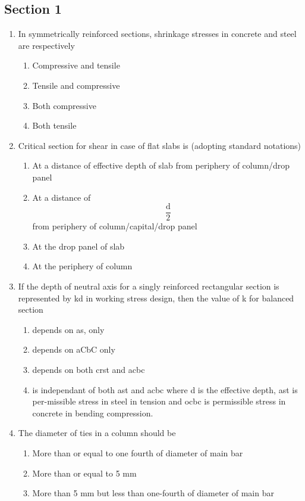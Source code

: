 \documentclass[11pt,a4paper]{article}
\begin{document}
\subsection*{Section 1}
\begin{enumerate}
\item{In symmetrically reinforced sections, shrinkage stresses in concrete and steel are respectively}
\begin{enumerate}[label=\Alph*.]
\item{Compressive and tensile}
\item{Tensile and compressive}
\item{Both compressive}
\item{Both tensile}
\end{enumerate}
\item{Critical section for shear in case of flat slabs is (adopting standard notations)}
\begin{enumerate}[label=\Alph*.]
\item{At a distance of effective depth of slab from periphery of column/drop panel}
\item{At a distance of $$\frac{{\text{d}}}{2}$$ from periphery of column/capital/drop panel}
\item{At the drop panel of slab}
\item{At the periphery of column}
\end{enumerate}
\item{If the depth of neutral axis for a singly reinforced rectangular section is represented by kd in working stress design, then the value of k for balanced section}
\begin{enumerate}[label=\Alph*.]
\item{depends on as, only}
\item{depends on aCbC only}
\item{depends on both crst and acbc}
\item{is independant of both ast and acbc where d is the effective depth, ast is per-missible stress in steel in tension and ocbc is permissible stress in concrete in bending compression.}
\end{enumerate}
\item{The diameter of ties in a column should be}
\begin{enumerate}[label=\Alph*.]
\item{More than or equal to one fourth of diameter of main bar}
\item{More than or equal to 5 mm}
\item{More than 5 mm but less than one-fourth of diameter of main bar}

\end{enumerate}
\end{enumerate}
\end{document}
